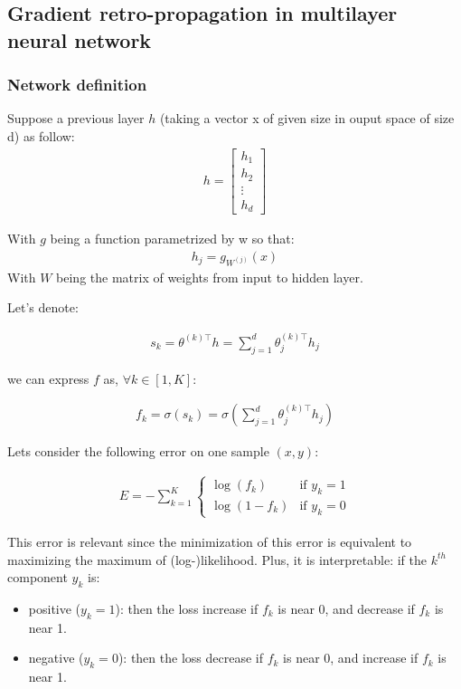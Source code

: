 \pagebreak

\subsection*{Gradient retro-propagation in multilayer neural network}

\subsubsection*{Network definition}

Suppose a previous layer $h$ (taking a vector x of given size in ouput space of size d) as follow:
\begin{align}
	h = 
	\begin{bmatrix} 
		h_1 \\
		h_2 \\
		\vdots \\
		h_d
	\end{bmatrix}
\end{align}


With $g$ being a function parametrized by w so that:
\begin{align}
	h_j = g_{W^{(j)}}(x)
\end{align}
With $W$ being the matrix of weights from input to hidden layer.


Let's denote:

\begin{align}
	s_k  = \theta^{(k)\top} h = \sum_{j=1}^{d} \theta^{(k)\top}_j h_j 
\end{align}

we can express $f$ as, $\forall k \in [1, K]$:

\begin{align}
	f_k  = \sigma(s_k) = \sigma( \sum_{j=1}^{d} \theta^{(k)\top}_j h_j) 
\end{align}

Lets consider the following error on one sample $(x, y)$:

\begin{align}
	E = - \sum_{k=1}^K
  			  	\left\{
				    \begin{array}{ll}
				        \log (f_k) & \mbox{if } y_k =1 \\
				        \log (1 - f_k) & \mbox{if } y_k =0
				    \end{array}
				\right.
\end{align}

This error is relevant since the minimization of this error is equivalent to maximizing the maximum of (log-)likelihood.
Plus, it is interpretable: if the $k^{th}$ component $y_k$ is:
\begin{itemize}
	\item positive ($y_k=1$): then the loss increase if $f_k$ is near 0, and decrease if $f_k$ is near 1.
	\item negative ($y_k=0$): then the loss decrease if $f_k$ is near 0, and increase if $f_k$ is near 1.
\end{itemize}



